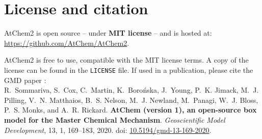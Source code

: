 \section{License and citation} \label{sec:license-citation}

AtChem2 is open source -- under \textbf{MIT license} -- and is hosted at:\\
\href{https://github.com/AtChem/AtChem2}{https://github.com/AtChem/AtChem2}.

AtChem2 is free to use, compatible with the MIT license terms. A copy
of the license can be found in the \texttt{LICENSE} file. If used in a
publication, please cite the GMD paper \citet{sommariva_2020}:\\

R.~Sommariva, S.~Cox, C.~Martin, K.~Boro{\'n}ska, J.~Young, P.~K. Jimack,
M.~J. Pilling, V.~N. Matthaios, B.~S. Nelson, M.~J. Newland, M.~Panagi,
W.~J. Bloss, P.~S. Monks, and A.~R. Rickard.
\textbf{AtChem (version 1), an open-source box model for the Master Chemical Mechanism}.
\textit{Geoscientific Model Development}, 13, 1, 169--183, 2020.
doi: \href{https://doi.org/10.5194/gmd-13-169-2020}{10.5194/gmd-13-169-2020}.

